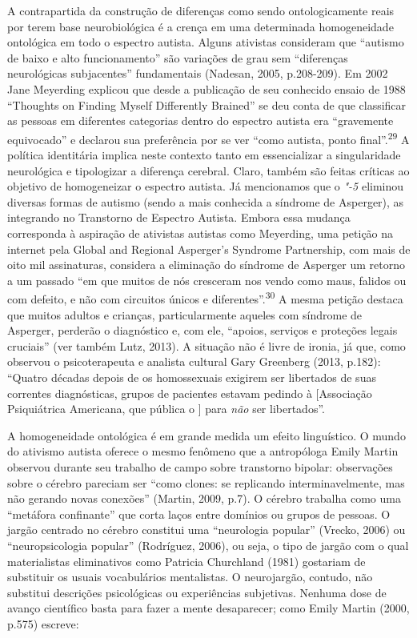 A contrapartida da construção de diferenças como sendo ontologicamente
reais por terem base neurobiológica é a crença em uma determinada
homogeneidade ontológica em todo o espectro autista. Alguns ativistas
consideram que ``autismo de baixo e alto funcionamento'' são variações
de grau sem ``diferenças neurológicas subjacentes'' fundamentais
(Nadesan, 2005, p.208-209). Em 2002 Jane Meyerding explicou que desde a
publicação de seu conhecido ensaio de 1988 ``Thoughts on Finding Myself
Differently Brained'' se deu conta de que classificar as pessoas em
diferentes categorias dentro do espectro autista era ``gravemente
equivocado'' e declarou sua preferência por se ver ``como autista, ponto
final''.\textsuperscript{29} A política identitária implica neste
contexto tanto em essencializar a singularidade neurológica e
tipologizar a diferença cerebral. Claro, também são feitas críticas ao
objetivo de homogeneizar o espectro autista. Já mencionamos que o
\emph{"-5} eliminou diversas formas de autismo (sendo a mais conhecida
a síndrome de Asperger), as integrando no Transtorno de Espectro
Autista. Embora essa mudança corresponda à aspiração de ativistas
autistas como Meyerding, uma petição na internet pela Global and
Regional Asperger's Syndrome Partnership, com mais de oito mil
assinaturas, considera a eliminação do síndrome de Asperger um retorno a
um passado ``em que muitos de nós cresceram nos vendo como maus, falidos
ou com defeito, e não com circuitos únicos e
diferentes''.\textsuperscript{30} A mesma petição destaca que muitos
adultos e crianças, particularmente aqueles com síndrome de Asperger,
perderão o diagnóstico e, com ele, ``apoios, serviços e proteções legais
cruciais'' (ver também Lutz, 2013). A situação não é livre de ironia, já
que, como observou o psicoterapeuta e analista cultural Gary Greenberg
(2013, p.182): ``Quatro décadas depois de os homossexuais exigirem ser
libertados de suas correntes diagnósticas, grupos de pacientes estavam
pedindo à  {[}Associação Psiquiátrica Americana, que pública o
\emph{}{]} para \emph{não} ser libertados''.

A homogeneidade ontológica é em grande medida um efeito linguístico. O
mundo do ativismo autista oferece o mesmo fenômeno que a antropóloga
Emily Martin observou durante seu trabalho de campo sobre transtorno
bipolar: observações sobre o cérebro pareciam ser ``como clones: se
replicando interminavelmente, mas não gerando novas conexões'' (Martin,
2009, p.7). O cérebro trabalha como uma ``metáfora confinante'' que
corta laços entre domínios ou grupos de pessoas. O jargão centrado no
cérebro constitui uma ``neurologia popular'' (Vrecko, 2006) ou
``neuropsicologia popular'' (Rodríguez, 2006), ou seja, o tipo de jargão
com o qual materialistas eliminativos como Patricia Churchland (1981)
gostariam de substituir os usuais vocabulários mentalistas. O
neurojargão, contudo, não substitui descrições psicológicas ou
experiências subjetivas. Nenhuma dose de avanço científico basta para
fazer a mente desaparecer; como Emily Martin (2000, p.575) escreve:

